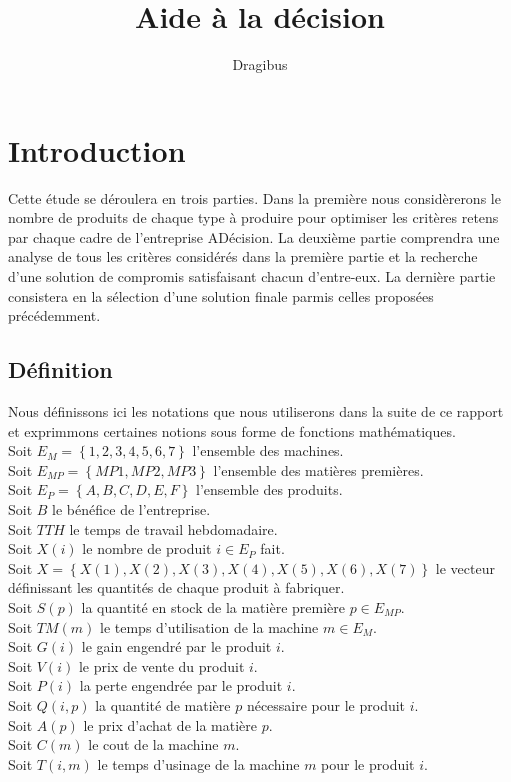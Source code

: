 \documentclass[a4paper, 11pt]{article}
\title{Aide à la décision}
\author{Dragibus}
\date{}
\begin{document}
\maketitle
\tableofcontents
\newpage

\section{Introduction}
Cette étude se déroulera en trois parties. Dans la première nous considèrerons
le nombre de produits de chaque type à produire pour optimiser les critères
retens par chaque cadre de l'entreprise ADécision. La deuxième partie
comprendra une analyse de tous les critères considérés dans la première partie
et la recherche d'une solution de compromis satisfaisant chacun d'entre-eux. La
dernière partie consistera en la sélection d'une solution finale parmis celles
proposées précédemment.

\subsection{Définition}
Nous définissons ici les notations que nous utiliserons dans la suite de ce
rapport et exprimmons certaines notions sous forme de fonctions mathématiques.
\\
Soit $E_M = \left\{1, 2, 3, 4, 5, 6, 7\right\} $ l'ensemble des machines. \\
Soit $E_{MP} = \left\{MP1, MP2, MP3\right\} $ l'ensemble des matières premières. \\
Soit $E_P = \left\{A, B, C, D, E, F\right\} $ l'ensemble des produits. \\
Soit $B$ le bénéfice de l'entreprise. \\
Soit $TTH$ le temps de travail hebdomadaire. \\
Soit $X(i)$ le nombre de produit $i\in E_P$ fait. \\
Soit $X = \left\{X(1), X(2), X(3), X(4), X(5), X(6), X(7)\right\}$ le vecteur
définissant les quantités de chaque produit à fabriquer.\\
Soit $S(p)$ la quantité en stock de la matière première $p\in E_{MP}$. \\
Soit $TM(m)$ le temps d'utilisation de la machine $m\in E_M$.\\
Soit $G(i)$ le gain engendré par le produit $i$. \\
Soit $V(i)$ le prix de vente du produit $i$. \\
Soit $P(i)$ la perte engendrée par le produit $i$. \\
Soit $Q(i, p)$ la quantité de matière $p$ nécessaire pour le produit $i$. \\
Soit $A(p)$ le prix d'achat de la matière $p$. \\
Soit $C(m)$ le cout de la machine $m$. \\
Soit $T(i, m)$ le temps d'usinage de la machine $m$ pour le produit $i$. \\
\end{document}
